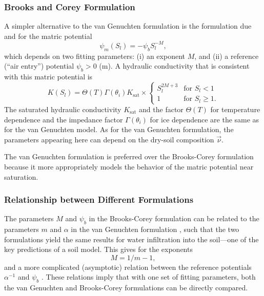 \documentclass[twoside,10pt]{report}
\begin{document}
\subsubsection{Brooks and Corey Formulation}

A simpler alternative to the van Genuchten formulation is the formulation due \citet{Brooks64a}  and \citet{Corey77a} for the matric potential
\begin{equation}\label{e:Brooks_Corey_potential}
    \psi_m(S_l) = - \psi_b S_l^{-M},
\end{equation}
which depends on two fitting parameters: (i) an exponent $M$, and (ii) a reference (``air entry'') potential $\psi_b>0$ ($\mathrm{m}$). A hydraulic conductivity that is consistent with this matric potential is 
\begin{equation}
     K(S_l) = \Theta(T) \Gamma(\theta_i) K_{\mathrm{sat}} \times
     \begin{cases}
     S_l^{2M+3} & \text{for } S_l < 1\\
     1          & \text{for } S_l \ge 1.
     \end{cases}
\end{equation}
The saturated hydraulic conductivity $ K_{\mathrm{sat}}$ and the factor $\Theta(T)$ for temperature dependence and the impedance factor $\Gamma(\theta_i)$ for ice dependence are the same as for the van Genuchten model. As for the van Genuchten formulation, the parameters appearing here can depend on the dry-soil composition $\vec{\nu}$. %

The van Genuchten formulation is preferred over the Brooks-Corey formulation because it more appropriately models the behavior of the matric potential near saturation. 

\subsubsection{Relationship between Different Formulations}

The parameters $M$ and $\psi_b$ in the Brooks-Corey formulation can be related to the parameters $m$ and $\alpha$ in the van Genuchten formulation \citep{Morel-Seytoux96a}, such that the two formulations yield the same results for water infiltration into the soil---one of the key predictions of a soil model. This gives for the exponents 
\[
M = 1/m - 1,
\]
and a more complicated (asymptotic) relation between the reference potentials $\alpha^{-1}$ and $\psi_b$ \citep{Morel-Seytoux96a}. These relations imply that with one set of fitting parameters, both the van Genuchten and Brooks-Corey formulations can be directly compared. 
\end{document}
